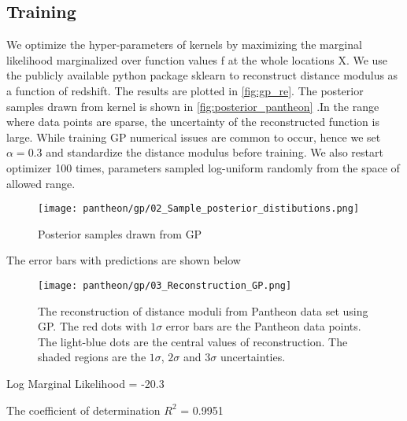 \subsection{Training}
We optimize the hyper-parameters of kernels by maximizing the marginal likelihood marginalized over function values f at the whole locations X. We use the publicly available python package sklearn\cite{scikit-learn} to reconstruct distance modulus as a function of redshift. The results are plotted in \eqref{fig:gp_re}. The posterior samples drawn from kernel is shown in \eqref{fig:posterior_pantheon} .In the range where data points are sparse, the uncertainty of the reconstructed function is large. While training GP numerical issues are common to occur, hence we set $\alpha=0.3$ and standardize the distance modulus before training. We also restart optimizer 100 times, parameters sampled log-uniform randomly from the space of allowed range.

\begin{figure}[H]
	\centering
	\texttt{[image: pantheon/gp/02\_Sample\_posterior\_distibutions.png]}
	\caption{Posterior samples drawn from GP}
	\label{fig:posterior_pantheon}
\end{figure}

The error bars with predictions are shown below
\begin{figure}[H]
	\centering
	\texttt{[image: pantheon/gp/03\_Reconstruction\_GP.png]}
	\caption{The reconstruction of distance moduli from Pantheon data set using GP. The red dots with $1\sigma$ error bars are the Pantheon data points. The light-blue dots are the central values of reconstruction. The shaded regions are the $1\sigma$, $2\sigma$ and $3\sigma$ uncertainties.}
	\label{fig:gp_re}
\end{figure}

Log Marginal Likelihood = -20.3

The coefficient of determination $R^2$ = 0.9951